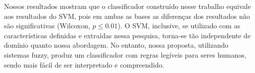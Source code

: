 \documentclass[template.tex]{subfiles}
\begin{document}
%
%
%

Nossos resultados mostram que o classificador construído nesse trabalho equivale aos resultados do SVM, pois em ambas as bases as diferenças dos resultados não são significativas (Wilcoxon, $p\leq0.01$). O SVM, inclusive, se utilizado com as características definidas e extraídas nessa pesquisa, torna-se tão independente de domínio quanto nossa abordagem. No entanto, nossa proposta, utilizando sistemas fuzzy, produz um classificador com regras legíveis para seres humanos, sendo mais fácil de ser interpretado e compreendido. 


\end{document}

